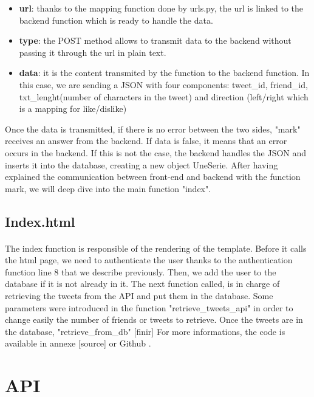 \begin{itemize}
  \item \textbf{url}: thanks to the mapping function done by urls.py, the url is linked to the backend function which is ready to handle the data. 
  \item \textbf{type}: the POST method allows to transmit data to the backend without passing it through the url in plain text.
  \item \textbf{data}: it is the content transmited by the function to the backend function. In this case, we are sending a JSON with four components:  tweet\_id, friend\_id, txt\_lenght(number of characters in the tweet) and direction (left/right which is a mapping for like/dislike) 
\end{itemize}

Once the data is transmitted, if there is no error between the two sides, "mark" receives an answer from the backend. If data is false, it means that an error occurs in the backend. If this is not the case, the backend handles the JSON and inserts it into the database, creating a new object UneSerie. After having explained the communication between front-end and backend with the function mark, we will deep dive into the main function "index".

 \subsection{Index.html}
 
\paragraph{}
The index function is responsible of the rendering of the template. Before it calls the html page, we need to authenticate the user thanks to the authentication function line 8 that we describe previously. Then, we add the user to the database if it is not already in it. The next function called, is in charge of retrieving the tweets from the API and put them in the database. Some parameters were introduced in the function "retrieve\_tweets\_api" in order to change easily the number of friends or tweets to retrieve. Once the tweets are in the database, "retrieve\_from\_db" [finir]
For more informations, the code is available in annexe [source] or Github \cite{tw_github} .

 \section{API}
 
